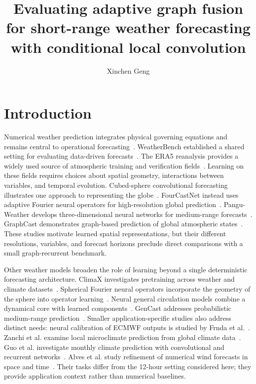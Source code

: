 \documentclass[fleqn,10pt]{wlscirep}
\title{Evaluating adaptive graph fusion for short-range weather forecasting with conditional local convolution}
\author[1,*]{Xinchen Geng}
\affil[1]{University of Southern California, Los Angeles, CA 90089, USA}
\affil[*]{Corresponding author: gengx@usc.edu}
\begin{document}
\raggedbottom
\maketitle
\thispagestyle{plain}

\section{Introduction}\label{sec:introduction}
Numerical weather prediction integrates physical governing equations and remains central to operational forecasting~\cite{bauer2015quiet}.
WeatherBench established a shared setting for evaluating data-driven forecasts~\cite{rasp2020weatherbench}.
The ERA5 reanalysis provides a widely used source of atmospheric training and verification fields~\cite{hersbach2020era5}.
Learning on these fields requires choices about spatial geometry, interactions between variables, and temporal evolution.
Cubed-sphere convolutional forecasting illustrates one approach to representing the globe~\cite{weyn2020improving}.
FourCastNet instead uses adaptive Fourier neural operators for high-resolution global prediction~\cite{pathak2022fourcastnet}.
Pangu-Weather develops three-dimensional neural networks for medium-range forecasts~\cite{bi2023accurate}.
GraphCast demonstrates graph-based prediction of global atmospheric states~\cite{lam2023learning}.
These studies motivate learned spatial representations, but their different resolutions, variables, and forecast horizons preclude direct comparisons with a small graph-recurrent benchmark.

Other weather models broaden the role of learning beyond a single deterministic forecasting architecture.
ClimaX investigates pretraining across weather and climate datasets~\cite{nguyen2023climax}.
Spherical Fourier neural operators incorporate the geometry of the sphere into operator learning~\cite{bonev2023spherical}.
Neural general circulation models combine a dynamical core with learned components~\cite{kochkov2024neural}.
GenCast addresses probabilistic medium-range prediction~\cite{price2025probabilistic}.
Smaller application-specific studies also address distinct needs: neural calibration of ECMWF outputs is studied by Frnda et al.~\cite{frnda2022ecmwf}.
Zanchi et al. examine local microclimate prediction from global climate data~\cite{zanchi2023microclimate}.
Guo et al. investigate monthly climate prediction with convolutional and recurrent networks~\cite{guo2024monthly}.
Alves et al. study refinement of numerical wind forecasts in space and time~\cite{alves2025spatiotemporal}.
Their tasks differ from the 12-hour setting considered here; they provide application context rather than numerical baselines.
\end{document}
